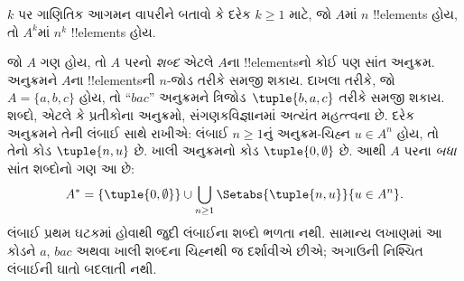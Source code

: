 \documentclass[../../../include/open-logic-section]{subfiles}
\begin{document}
\begin{prob}
$k$ પર ગાણિતિક આગમન વાપરીને બતાવો કે દરેક $k \ge 1$ માટે,
જો $A$માં $n$ !!{element}s હોય, તો $A^k$માં $n^k$ !!{element}s હોય.
\end{prob}

\begin{ex}
જો $A$ ગણ હોય, તો $A$ પરનો \emph{શબ્દ} એટલે $A$ના !!{element}sનો
કોઈ પણ સાંત અનુક્રમ. અનુક્રમને $A$ના !!{element}sની $n$-જોડ તરીકે સમજી શકાય.
દાખલા તરીકે, જો $A = \{a, b, c\}$ હોય, તો “$bac$” અનુક્રમને
ત્રિજોડ~$\tuple{b, a, c}$ તરીકે સમજી શકાય.
શબ્દો, એટલે કે પ્રતીકોના અનુક્રમો, સંગણકવિજ્ઞાનમાં અત્યંત મહત્ત્વના છે.
દરેક અનુક્રમને તેની લંબાઈ સાથે રાખીએ: લંબાઈ $n\ge1$નું
અનુક્રમ-ચિહ્ન $u\in A^n$ હોય, તો તેનો કોડ $\tuple{n,u}$ છે.
ખાલી અનુક્રમનો કોડ $\tuple{0,\emptyset}$ છે.
આથી $A$ પરના \emph{બધા} સાંત શબ્દોનો ગણ આ છે:
\[
A^* = \{\tuple{0,\emptyset}\}
\cup \bigcup_{n\ge1}\Setabs{\tuple{n,u}}{u\in A^n}.
\]
લંબાઈ પ્રથમ ઘટકમાં હોવાથી જુદી લંબાઈના શબ્દો ભળતા નથી.
સામાન્ય લખાણમાં આ કોડને $a$, $bac$ અથવા ખાલી શબ્દના
ચિહ્નથી જ દર્શાવીએ છીએ; અગાઉની નિશ્ચિત લંબાઈની ઘાતો બદલાતી નથી.

\end{ex}
\end{document}

